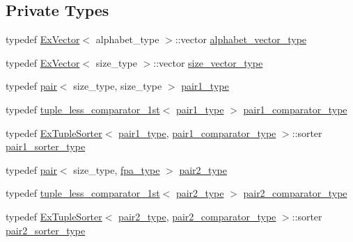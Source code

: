\subsection*{Private Types}
\begin{DoxyCompactItemize}
\item 
typedef \hyperlink{struct_ex_vector}{Ex\+Vector}$<$ alphabet\+\_\+type $>$\+::vector \hyperlink{class_validate3_a7a893a89f745710a34958b37717cb024}{alphabet\+\_\+vector\+\_\+type}
\item 
typedef \hyperlink{struct_ex_vector}{Ex\+Vector}$<$ size\+\_\+type $>$\+::vector \hyperlink{class_validate3_a9dcb1d691c20940089a7e6fbf1619069}{size\+\_\+vector\+\_\+type}
\item 
typedef \hyperlink{structpair}{pair}$<$ size\+\_\+type, size\+\_\+type $>$ \hyperlink{class_validate3_abecec0e807ea06aac66c60387611e78a}{pair1\+\_\+type}
\item 
typedef \hyperlink{structtuple__less__comparator__1st}{tuple\+\_\+less\+\_\+comparator\+\_\+1st}$<$ \hyperlink{class_validate3_abecec0e807ea06aac66c60387611e78a}{pair1\+\_\+type} $>$ \hyperlink{class_validate3_ace20fdc998ec6fb2c559aaf7413d464e}{pair1\+\_\+comparator\+\_\+type}
\item 
typedef \hyperlink{struct_ex_tuple_sorter}{Ex\+Tuple\+Sorter}$<$ \hyperlink{class_validate3_abecec0e807ea06aac66c60387611e78a}{pair1\+\_\+type}, \hyperlink{class_validate3_ace20fdc998ec6fb2c559aaf7413d464e}{pair1\+\_\+comparator\+\_\+type} $>$\+::sorter \hyperlink{class_validate3_a6b5f6c01fe108e6c572c52249bf37caa}{pair1\+\_\+sorter\+\_\+type}
\item 
typedef \hyperlink{structpair}{pair}$<$ size\+\_\+type, \hyperlink{common_8h_a7fdaf8b9b3d2f6ae6b10597a8d3f96ee}{fpa\+\_\+type} $>$ \hyperlink{class_validate3_aa5a02458227330cbaaf91b58684625f0}{pair2\+\_\+type}
\item 
typedef \hyperlink{structtuple__less__comparator__1st}{tuple\+\_\+less\+\_\+comparator\+\_\+1st}$<$ \hyperlink{class_validate3_aa5a02458227330cbaaf91b58684625f0}{pair2\+\_\+type} $>$ \hyperlink{class_validate3_a9a5316faa3c44f8f5743fec09cdea491}{pair2\+\_\+comparator\+\_\+type}
\item 
typedef \hyperlink{struct_ex_tuple_sorter}{Ex\+Tuple\+Sorter}$<$ \hyperlink{class_validate3_aa5a02458227330cbaaf91b58684625f0}{pair2\+\_\+type}, \hyperlink{class_validate3_a9a5316faa3c44f8f5743fec09cdea491}{pair2\+\_\+comparator\+\_\+type} $>$\+::sorter \hyperlink{class_validate3_a3a7778ec3337ed3baf9a7515cf0a94ad}{pair2\+\_\+sorter\+\_\+type}
\item 

\end{DoxyCompactItemize}
